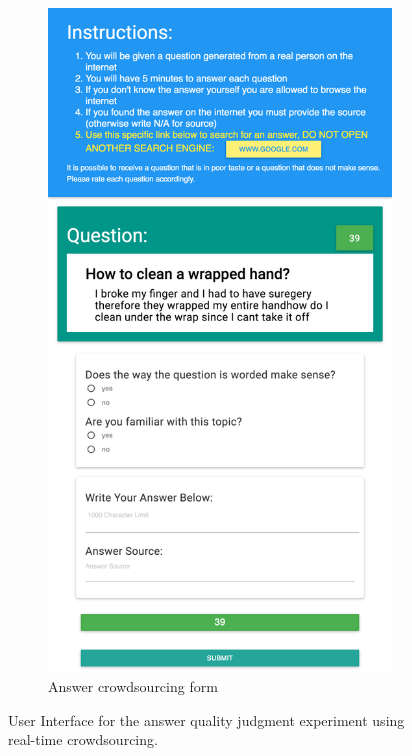 \begin{figure}[h!]
\begin{subfigure}[b]{0.49\textwidth}
\includegraphics[width=0.9\linewidth]{img/answering_screenshot}
\caption{Answer crowdsourcing form}
\label{figure:non-factoid:crowdsourcing:interfaces:answer}
\end{subfigure}

\caption{User Interface for the answer quality judgment experiment using real-time crowdsourcing.}
\label{figure:non-factoid:crowdsourcing:interfaces}
\end{figure}

